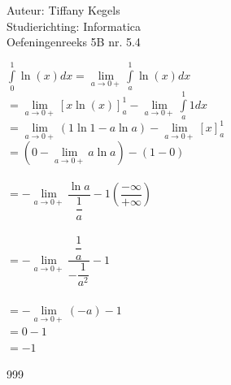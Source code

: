 \documentclass[a4paper]{article}
\begin{document}
  
\noindent \large Auteur: Tiffany Kegels \\
\noindent \large Studierichting: Informatica\\
\noindent \large Oefeningenreeks 5B nr. 5.4\\

\medskip

\normalsize

$ \displaystyle\int\limits_0^1 \ln(x)dx=\lim\limits_{a\to0+}\displaystyle\int\limits_a^1 \ln(x)dx $\\

$ =\lim\limits_{a\to0+}\left[x\ln(x)\right]_a^1-\lim\limits_{a\to0+}\displaystyle\int\limits_a^1 1dx $\\

$ =\lim\limits_{a\to0+}(1\ln1-a\ln a)-\lim\limits_{a\to0+}[x]_a^1 $\\

$ =\left(0-\lim\limits_{a\to0+}a\ln a\right)-(1-0) $\\

\\

$ =-\lim\limits_{a\to0+}\dfrac{\ln a}{\dfrac{1}{a}}-1\left(\dfrac{-\infty}{+\infty}\right)$\\\\


$ =-\lim\limits_{a\to0+}\dfrac{\dfrac{1}{a}}{-\dfrac{1}{a^2}}-1 $\\\\



$ =-\lim\limits_{a\to0+}(-a)-1 $\\

$ =0-1 $\\

$ =-1 $

\begin{thebibliography}{999}

\end{thebibliography}
\end{document}
